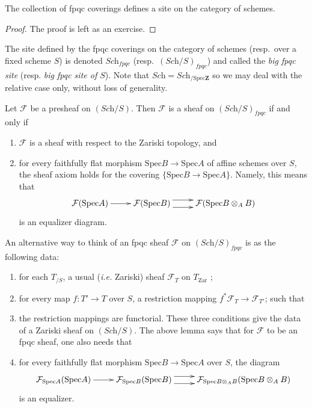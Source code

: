 \begin{lemma}
\label{lemma-site-fpqc}
The collection of fpqc coverings defines a site on the category of schemes.
\end{lemma}

\begin{proof}
The proof is left as an exercise.
\end{proof}

\begin{definition}
\label{definition-fpqc-site}
The site defined by the fpqc coverings on the category of schemes
(resp.\ over a fixed scheme $S$) is denoted $\textit{Sch}_{fpqc}$
(resp.\ $(\textit{Sch}/S)_{fpqc}$) and called the
{\it big fpqc site} (resp. {\it big fpqc site of $S$}).
Note that $\textit{Sch} = \textit{Sch}_{/\text{Spec}\mathbf{Z}}$ so we
may deal with the relative case only, without loss of generality.
\end{definition}

\begin{lemma}
\label{lemma-fpqc-sheaves}
Let $\mathcal{F}$ be a presheaf on $(\textit{Sch}/S)$. Then $\mathcal{F}$ is a
sheaf on $(\textit{Sch}/S)_{fpqc}$ if and only if
\begin{enumerate}
\item $\mathcal{F}$ is a sheaf with respect to the Zariski topology, and
\item for every faithfully flat morphism $\text{Spec} B \to \text{Spec} A$ of
affine schemes over $S$, the sheaf axiom holds for the covering $\{\text{Spec}
B \to \text{Spec} A\}$. Namely, this means that
$$
\xymatrix{
\mathcal{F}(\text{Spec} A) \ar[r] &
\mathcal{F}(\text{Spec} B) \ar@<1ex>[r] \ar@<-1ex>[r] &
\mathcal{F}(\text{Spec} B \otimes_A B)
}
$$
is an equalizer diagram.
\end{enumerate}
\end{lemma}

\noindent
An alternative way to think of an fpqc sheaf $\mathcal{F}$ on
$(\textit{Sch}/S)_{fpqc}$ is as the following data:
\begin{enumerate}
\item for each $T_{/S}$, a usual ({\it i.e.} Zariski) sheaf $\mathcal{F}_T$ on
$T_{\mathrm{Zar}}$ ;
\item for every map $f : T' \to T$ over $S$, a restriction mapping $f^*
\mathcal{F}_T \to \mathcal{F}_{T'} $; such that
\item the restriction mappings are functorial. These three conditions give the
data of a Zariski sheaf on $(\textit{Sch}/S)$. The above lemma says that for
$\mathcal{F}$ to be an fpqc sheaf, one also needs that
\item for every faithfully flat morphism $\text{Spec} B \to \text{Spec} A$ over
$S$, the diagram
$$
\xymatrix{
\mathcal{F}_{\text{Spec} A}(\text{Spec} A) \ar[r] &
\mathcal{F}_{\text{Spec} B}(\text{Spec} B) \ar@<1ex>[r] \ar@<-1ex>[r] &
\mathcal{F}_{\text{Spec} B \otimes_A B}(\text{Spec} B \otimes_A B)
}
$$
is an equalizer.
\end{enumerate}

